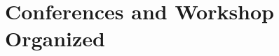 \documentclass[11pt,letterpaper]{report}
\begin{document}







    \section*{Conferences and Workshop Organized}





\end{document}
